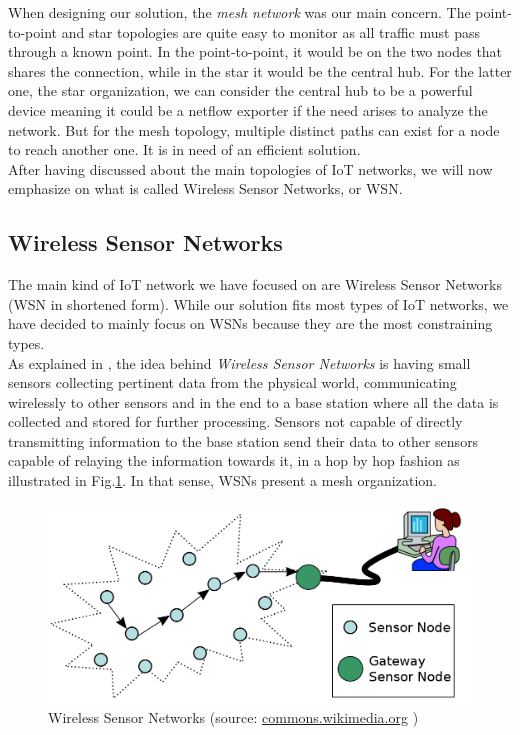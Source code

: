 When designing our solution, the \textit{mesh network} was our main concern. The point-to-point and star topologies are quite easy to monitor as all traffic must pass through a known point. In the point-to-point, it would be on the two nodes that shares the connection, while in the star it would be the central hub. For the latter one, the star organization, we can consider the central hub to be a powerful device meaning it could be a netflow exporter if the need arises to analyze the network. But for the mesh topology, multiple distinct paths can exist for a node to reach another one. It is in need of an efficient solution. \\

After having discussed about the main topologies of IoT networks, we will now emphasize on what is called Wireless Sensor Networks, or WSN.


\subsection{Wireless Sensor Networks}

The main kind of IoT network we have focused on are Wireless Sensor Networks (WSN in shortened form). While our solution fits most types of IoT networks, we have decided to mainly focus on WSNs because they are the most constraining types.\\

As explained in \cite{vasseur2010interconnecting}, the idea behind \textit{Wireless Sensor Networks} is having small sensors collecting pertinent data from the physical world, communicating wirelessly to other sensors and in the end to a base station where all the data is collected and stored for further processing. Sensors not capable of directly transmitting information to the base station send their data to other sensors capable of relaying the information towards it, in a hop by hop fashion as illustrated in Fig.\ref{fig:wsn}. In that sense, WSNs present a mesh organization.\\

\begin{figure}
  \centering
  \includegraphics[width=\textwidth]{res/wsn.png}
  \caption{Wireless Sensor Networks (source: \href{commons.wikimedia.org/wiki/File:WSN.svg}{commons.wikimedia.org} )}
  \label{fig:wsn}
\end{figure}

